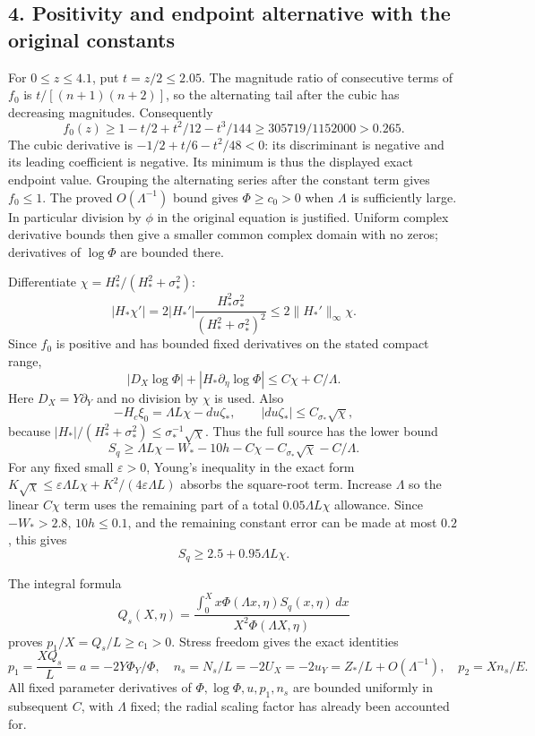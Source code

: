 \documentclass[10pt,a4paper]{article}
\begin{document}
\subsection{4. Positivity and endpoint alternative with the original constants}

For \(0\le z\le4.1\), put \(t=z/2\le2.05\). The magnitude ratio of consecutive terms of \(f_0\) is \(t/[(n+1)(n+2)]\), so the alternating tail after the cubic has decreasing magnitudes. Consequently
\[
f_0(z)\ge1-t/2+t^2/12-t^3/144
\ge305719/1152000>0.265.
\]
The cubic derivative is \(-1/2+t/6-t^2/48<0\): its discriminant is negative and its leading coefficient is negative. Its minimum is thus the displayed exact endpoint value. Grouping the alternating series after the constant term gives \(f_0\le1\). The proved \(O(\Lambda^{-1})\) bound gives \(\Phi\ge c_0>0\) when \(\Lambda\) is sufficiently large. In particular division by \(\phi\) in the original equation is justified. Uniform complex derivative bounds then give a smaller common complex domain with no zeros; derivatives of \(\log\Phi\) are bounded there.

Differentiate \(\chi=H_*^2/(H_*^2+\sigma_*^2)\):
\[
|H_*\chi'|=2|H_*'|\frac{H_*^2\sigma_*^2}{(H_*^2+\sigma_*^2)^2}
\le2\|H_*'\|_\infty\chi.
\]
Since \(f_0\) is positive and has bounded fixed derivatives on the stated compact range,
\[
|D_X\log\Phi|+|H_*\partial_\eta\log\Phi|
\le C\chi+C/\Lambda.
\]
Here \(D_X=Y\partial_Y\) and no division by \(\chi\) is used. Also
\[
-H_c\xi_0=\Lambda L\chi-du\zeta_*,\qquad
|du\zeta_*|\le C_{\sigma_*}\sqrt\chi,
\]
because \(|H_*|/(H_*^2+\sigma_*^2)\le\sigma_*^{-1}\sqrt\chi\). Thus the full source has the lower bound
\[
S_q\ge\Lambda L\chi-W_*-10h-C\chi-C_{\sigma_*}\sqrt\chi-C/\Lambda.
\]
For any fixed small \(\varepsilon>0\), Young's inequality in the exact form
\(K\sqrt\chi\le\varepsilon\Lambda L\chi+K^2/(4\varepsilon\Lambda L)\)
absorbs the square-root term. Increase \(\Lambda\) so the linear \(C\chi\) term uses the remaining part of a total \(0.05\Lambda L\chi\) allowance. Since \(-W_*>2.8\), \(10h\le0.1\), and the remaining constant error can be made at most \(0.2\), this gives
\[
S_q\ge2.5+0.95\Lambda L\chi.
\]

The integral formula
\[
Q_s(X,\eta)=\frac{\int_0^Xx\Phi(\Lambda x,\eta)S_q(x,\eta)\,dx}
{X^2\Phi(\Lambda X,\eta)}
\]
proves \(p_1/X=Q_s/L\ge c_1>0\). Stress freedom gives the exact identities
\[
p_1=\frac{XQ_s}L=a=-2Y\Phi_Y/\Phi,
\quad n_s=N_s/L=-2U_X=-2u_Y=Z_*/L+O(\Lambda^{-1}),
\quad p_2=Xn_s/E.
\]
All fixed parameter derivatives of \(\Phi,\log\Phi,u,p_1,n_s\) are bounded uniformly in subsequent \(C\), with \(\Lambda\) fixed; the radial scaling factor has already been accounted for.
\end{document}
